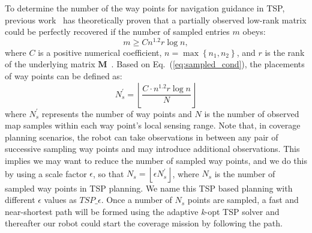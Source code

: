 To determine the number of the way points for navigation guidance in TSP, previous work~\cite{candes2009exact} has theoretically proven that a partially observed low-rank matrix could be perfectly recovered if the number of sampled entries $m$ obeys:
\begin{equation}
    \label{eq:sampled_cond}
        m\geq Cn^{1.2}r\log n,
\end{equation}
where $C$ is a positive numerical coefficient, $n = \max\left \{ n_1, n_2 \right \}$, and $r$ is the rank of the underlying matrix $\mathbf{M}$~\cite{candes2009exact}. Based on Eq.~(\ref{eq:sampled_cond}),
the placements of way points
can be defined %
as:
\begin{equation}
    \label{eq:sample_num}
    N^{'}_{s} = \left \lfloor \frac{C\cdot n^{1.2}r\log n}{N} \right \rfloor
\end{equation}
where $N^{'}_{s}$ represents the number of way points and $N$ is the number of observed map samples within each way point's local sensing range. 
Note that, in coverage planning scenarios, the robot can take observations in between any pair of successive sampling way points and may introduce additional observations. This implies we may want to reduce the number of sampled way points, %
and we do this by using a scale factor $\epsilon$, so that $N_{s} = \left \lfloor \epsilon N^{'}_{s} \right \rfloor$, 
where $N_{s}$ is the number of sampled way points in TSP planning. 
We name this TSP based planning with different $\epsilon$ values as $TSP\_\epsilon$. 
Once a number of $N_{s}$ points are sampled, a fast and  near-shortest path will be formed using the adaptive \textit{k}-opt TSP solver and thereafter our robot could start the coverage mission by following the path. 


